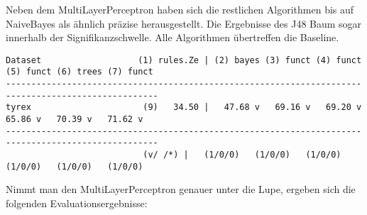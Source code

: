 \documentclass[]{article}
\begin{document}
Neben dem MultiLayerPerceptron haben sich die restlichen Algorithmen bis
auf NaiveBayes als ähnlich präzise herausgestellt. Die Ergebnisse des
J48 Baum sogar innerhalb der Signifikanzschwelle. Alle Algorithmen
übertreffen die Baseline.

\begin{verbatim}
Dataset                   (1) rules.Ze | (2) bayes (3) funct (4) funct (5) funct (6) trees (7) funct
----------------------------------------------------------------------------------------------------
tyrex                      (9)   34.50 |   47.68 v   69.16 v   69.20 v   65.86 v   70.39 v   71.62 v
----------------------------------------------------------------------------------------------------
                           (v/ /*) |   (1/0/0)   (1/0/0)   (1/0/0)   (1/0/0)   (1/0/0)   (1/0/0)
\end{verbatim}

Nimmt man den MultiLayerPerceptron genauer unter die Lupe, ergeben sich
die folgenden Evaluationsergebnisse:
\end{document}
